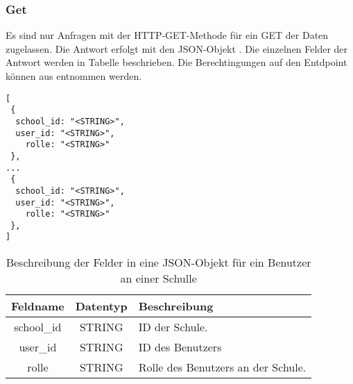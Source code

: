 \subsubsection{Get}
\label{sec:end:rest:api:school:users:get}
Es sind nur Anfragen mit der HTTP-GET-Methode für ein GET der Daten zugelassen.
Die Antwort erfolgt mit den JSON-Objekt . Die einzelnen Felder der Antwort werden in Tabelle  beschrieben.
Die Berechtingungen auf den Entdpoint können aus  entnommen werden.

\begin{lstlisting}[caption={JSON-Antwort für einen GET-Aufruf der Route /api/school/users},label={lst:code:end:rest:api:school:users:get:ret},frame=tlrb]
[
 {
  school_id: "<STRING>",
  user_id: "<STRING>",
	rolle: "<STRING>"
 },
...
 {
  school_id: "<STRING>",
  user_id: "<STRING>",
	rolle: "<STRING>"
 },
]
\end{lstlisting}

\begin{table}[htb]
	\begin{tabularx}{\textwidth}{|c|c|X|}
		\hline
			\textbf{Feldname} & \textbf{Datentyp} & \textbf{Beschreibung} \\ \hline
			school\_id & STRING & ID der Schule. \\ \hline
			user\_id & STRING & ID des Benutzers \\ \hline
			rolle & STRING & Rolle des Benutzers an der Schule. \\ \hline
	\end{tabularx}

		\caption{Beschreibung der Felder in eine JSON-Objekt für ein Benutzer an einer Schulle}
		\label{tab:end:rest:api:school:users:get:ret:json}
\end{table}

